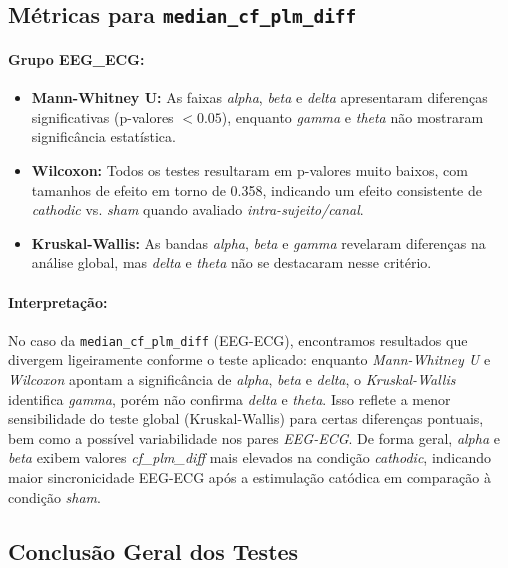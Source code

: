 \subsection{\texorpdfstring{Métricas para \texttt{median\_cf\_plm\_diff}}{Métricas para median\_cf\_plm\_diff}}

\paragraph{Grupo EEG\_ECG:}
\begin{itemize}
    \item \textbf{Mann-Whitney U:} As faixas \emph{alpha}, \emph{beta} e \emph{delta} apresentaram diferenças significativas (p-valores $< 0.05$), enquanto \emph{gamma} e \emph{theta} não mostraram significância estatística.
    \item \textbf{Wilcoxon:} Todos os testes resultaram em p-valores muito baixos, com tamanhos de efeito em torno de 0.358, indicando um efeito consistente de \emph{cathodic} vs. \emph{sham} quando avaliado \emph{intra-sujeito/canal}.
    \item \textbf{Kruskal-Wallis:} As bandas \emph{alpha}, \emph{beta} e \emph{gamma} revelaram diferenças na análise global, mas \emph{delta} e \emph{theta} não se destacaram nesse critério.
\end{itemize}

\paragraph{Interpretação:}

No caso da \texttt{median\_cf\_plm\_diff} (EEG-ECG), encontramos resultados que divergem ligeiramente conforme o teste aplicado: enquanto \emph{Mann-Whitney U} e \emph{Wilcoxon} apontam a significância de \emph{alpha}, \emph{beta} e \emph{delta}, o \emph{Kruskal-Wallis} identifica \emph{gamma}, porém não confirma \emph{delta} e \emph{theta}. Isso reflete a menor sensibilidade do teste global (Kruskal-Wallis) para certas diferenças pontuais, bem como a possível variabilidade nos pares \emph{EEG-ECG}. De forma geral, \emph{alpha} e \emph{beta} exibem valores \emph{cf_plm_diff} mais elevados na condição \emph{cathodic}, indicando maior sincronicidade EEG-ECG após a estimulação catódica em comparação à condição \emph{sham}.


\subsection{Conclusão Geral dos Testes}

